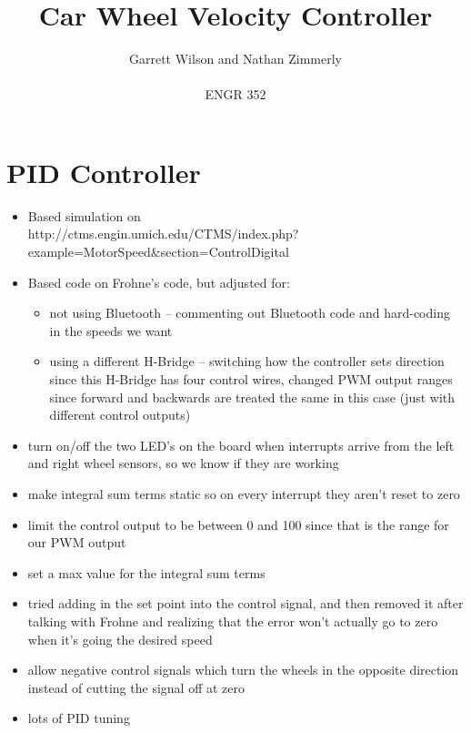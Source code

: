 \documentclass{article}
\begin{document}
\title{Car Wheel Velocity Controller}
\author{Garrett Wilson and Nathan Zimmerly \\ \\
ENGR 352}
\maketitle

\clearpage

\tableofcontents

\pagebreak

\section{PID Controller}
\begin{itemize}
\item Based simulation on \\ http://ctms.engin.umich.edu/CTMS/index.php?example=MotorSpeed\&section=ControlDigital
\item Based code on Frohne's code, but adjusted for:
	\begin{itemize}
	\item not using Bluetooth -- commenting out Bluetooth code and hard-coding in the speeds we want
	\item using a different H-Bridge -- switching how the controller sets direction since this H-Bridge has four control wires, changed PWM output ranges since forward and backwards are treated the same in this case (just with different control outputs)
	\end{itemize}
\item turn on/off the two LED's on the board when interrupts arrive from the left and right wheel sensors, so we know if they are working
\item make integral sum terms static so on every interrupt they aren't reset to zero
\item limit the control output to be between 0 and 100 since that is the range for our PWM output
\item set a max value for the integral sum terms
\item tried adding in the set point into the control signal, and then removed it after talking with Frohne and realizing that the error won't actually go to zero when it's going the desired speed
\item allow negative control signals which turn the wheels in the opposite direction instead of cutting the signal off at zero
\item lots of PID tuning
\end{itemize}
\end{document}

